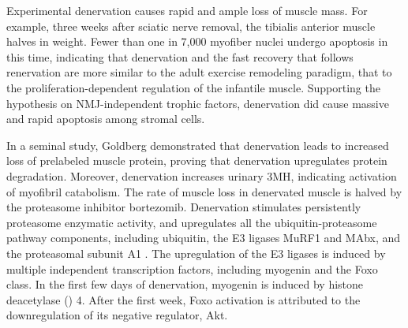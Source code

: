 \documentclass[12pt,english]{report}\usepackage[]{graphicx}\usepackage[]{color}
\begin{document}
Experimental denervation causes rapid and ample loss of muscle mass.
For example, three weeks after sciatic nerve removal, the tibialis
anterior muscle halves in weight\citep{macdonald2014denervation}.
Fewer than one in 7,000 myofiber nuclei undergo apoptosis in this
time\citep{bruusgaard2008vivo}, indicating that denervation and the
fast recovery that follows renervation are more similar to the adult
exercise remodeling paradigm, that to the proliferation-dependent
regulation of the infantile muscle. Supporting the hypothesis on NMJ-independent
trophic factors, denervation did cause massive and rapid apoptosis
among stromal cells.

In a seminal study, Goldberg demonstrated that denervation leads to
increased loss of prelabeled muscle protein, proving that denervation
upregulates protein degradation\citep{goldberg1969protein}. Moreover,
denervation increases urinary 3MH, indicating activation of myofibril
catabolism\citep{furuno1990role}. The rate of muscle loss in denervated
muscle is halved by the proteasome inhibitor bortezomib\citep{beehler2006reduction}.
Denervation stimulates persistently proteasome enzymatic activity\citep{gomes2012upregulation},
and upregulates all the ubiquitin-proteasome pathway components, including
ubiquitin, the E3 ligases MuRF1 and MAbx, and the proteasomal subunit
A1 \citep{medina1995increase,bodine2001identification}. The upregulation
of the E3 ligases is induced by multiple independent transcription
factors, including myogenin and the Foxo class\citep{fjallstrom2014forkhead,moresi2010myogenin,tang2014mtorc1,macpherson2011myogenin}.
In the first few days of denervation, myogenin is induced by histone
deacetylase () 4\citep{tang2009histone}.
After the first week, Foxo activation is attributed to the downregulation
of its negative regulator, Akt\citep{tang2014mtorc1,bodine2001akt/mtor}.
\end{document}
